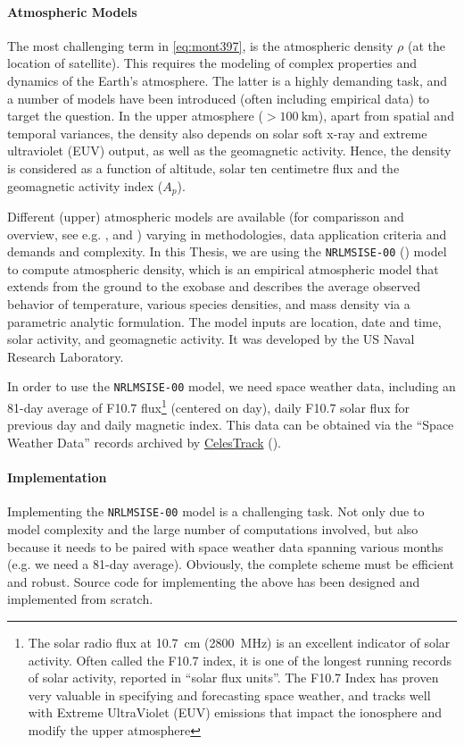 \paragraph{Atmospheric Models}\label{par:atmospheric-models}
The most challenging term in \ref{eq:mont397}, is the atmospheric density $\rho$ 
(at the location of satellite). This requires the modeling of complex properties 
and dynamics of the Earth's atmosphere. The latter is a highly demanding task, and 
a number of models have been introduced (often including empirical data) to 
target the question. In the upper atmosphere ($>\SI{100}{\km}$), apart from spatial 
and temporal variances, the density also depends on solar soft x-ray and extreme 
ultraviolet (EUV) output, as well as the geomagnetic activity. Hence, the density is 
considered as a function of altitude, solar ten centimetre flux and the geomagnetic 
activity index ($A_p$). 

Different (upper) atmospheric models are available (for comparisson and overview, see e.g. 
\cite{Doornbos2009}, \cite{Yang2022} and \cite{Vallado2014}) varying in methodologies, 
data application criteria and demands and complexity. In this Thesis, we are using 
the \texttt{NRLMSISE-00} (\cite{nrlmsise00}) model to compute atmospheric density, which is
an empirical atmospheric model that extends from the ground to the exobase and describes 
the average observed behavior of temperature, various species densities, and mass density 
via a parametric analytic formulation. The model inputs are location, date and time, 
solar activity, and geomagnetic activity. It was developed by the US Naval Research Laboratory.

In order to use the \texttt{NRLMSISE-00} model, we need space weather data, including 
an 81-day average of F10.7 flux\footnote{The solar radio flux at \SI{10.7}{\cm} (\SI{2800}{\MHz}) 
is an excellent indicator of solar activity. Often called the F10.7 index, it is 
one of the longest running records of solar activity, reported in ``solar flux units''. 
The F10.7 Index has proven very valuable in specifying and forecasting space weather, 
and tracks well with Extreme UltraViolet (EUV) emissions that impact the ionosphere 
and modify the upper atmosphere} (centered on day), daily F10.7 solar flux for previous 
day and daily magnetic index. This data can be obtained via the ``Space Weather Data'' 
records archived by \href{https://celestrak.org/}{CelesTrack} (\cite{Vallado2013}).

\paragraph{Implementation}\label{par:atmospheric-drag-implementation}

Implementing the \texttt{NRLMSISE-00} model is a challenging task. Not only due to
model complexity and the large number of computations involved, but also because 
it needs to be paired with space weather data spanning various months (e.g. we need a 
81-day average). Obviously, the complete scheme must be efficient and robust.
Source code for implementing the above has been designed and implemented from scratch.

